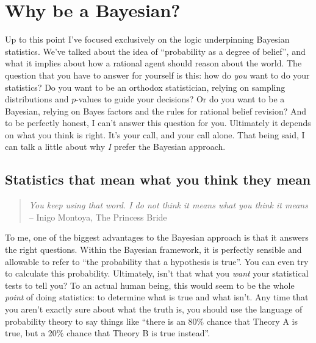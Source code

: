 \section{Why be a Bayesian?\label{sec:whybayes}}

Up to this point I've focused exclusively on the logic underpinning Bayesian statistics. We've talked about the idea of ``probability as a degree of belief'', and what it implies about how a rational agent should reason about the world. The question that you have to answer for yourself is this: how do {\it you} want to do your statistics? Do you want to be an orthodox statistician, relying on sampling distributions and $p$-values to guide your decisions? Or do you want to be a Bayesian, relying on Bayes factors and the rules for rational belief revision? And to be perfectly honest, I can't answer this question for you. Ultimately it depends on what you think is right. It's your call, and your call alone. That being said, I can talk a little about why {\it I} prefer the Bayesian approach. 

\subsection{Statistics that mean what you think they mean}

\begin{quote}
{\it You keep using that word. I do not think it means what you think it means} \\
\hspace*{2cm} -- Inigo Montoya, The Princess Bride
\end{quote}

To me, one of the biggest advantages to the Bayesian approach is that it answers the right questions. Within the Bayesian framework, it is perfectly sensible and allowable to refer to ``the probability that a hypothesis is true''. You can even try to calculate this probability. Ultimately, isn't that what you {\it want} your statistical tests to tell you? To an actual human being, this would seem to be the whole {\it point} of doing statistics: to determine what is true and what isn't. Any time that you aren't exactly sure about what the truth is, you should use the language of probability theory to say things like ``there is an 80\% chance that Theory A is true, but a 20\% chance that Theory B is true instead''. 

